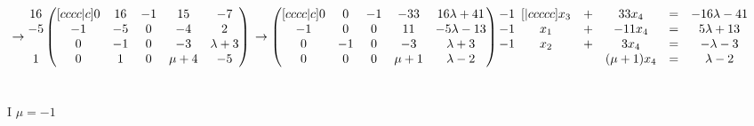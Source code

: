 \documentclass{article}
\begin{document}
\begin{math}
        \\
        \\
        \to
        \begin{matrix}
          16\\
          -5\\
          ~\\
          1
        \end{matrix}
        \begin{pmatrix}[cccc|c]
             0 & 16 & -1 & 15 & -7\\
             -1 & -5 & 0 & -4 & 2\\
             0 & -1 & 0 & -3 & \lambda + 3\\
             0 & 1 & 0 & \mu + 4 & -5
        \end{pmatrix}\\
        \\
        \\
        \to
        \begin{pmatrix}[cccc|c]
             0 & 0 & -1 & -33 & 16\lambda + 41\\
             -1 & 0 & 0 & 11 & -5\lambda - 13\\
             0 & -1 & 0 & -3 & \lambda + 3\\
             0 & 0 & 0 & \mu + 1 & \lambda - 2
        \end{pmatrix}
        \begin{matrix}
          -1\\
          -1\\
          -1\\
          ~
        \end{matrix}
        \\
        \\
        \\
        \begin{matrix}[|ccccc]
            x_3 & + & 33x_4 & = & -16\lambda - 41\\
            x_1 & + & -11x_4 & = & 5\lambda + 13\\
            x_2 & + & 3x_4 & = & -\lambda - 3\\
            ~ & ~ & (\mu + 1)x_4 & = & \lambda - 2\\
        \end{matrix}
    \end{math}\\
    \\
    \\
    I \(\mu = -1\)\\
\end{document}
